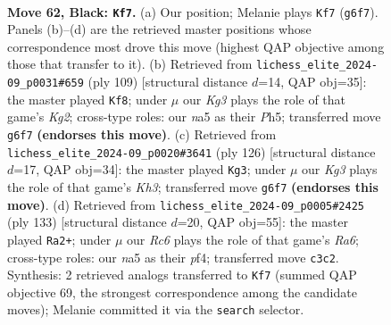 \documentclass[11pt]{article}
\begin{document}
\clearpage

\begin{figure}[p]\centering
\begin{subfigure}{0.46\textwidth}\centering
\resizebox{\linewidth}{!}{%
\newchessgame
\chessboard[
  setfen={8/6p1/3R1pk1/N6p/3P3P/2r3P1/7K/8 b - - 18 62},
  showmover=false,
  pgfstyle=straightmove, color=movearrow, markmove={g6-f7}
]}
\caption{}
\end{subfigure}\hfill
\begin{subfigure}{0.46\textwidth}\centering
\resizebox{\linewidth}{!}{%
\newchessgame
\chessboard[
  setfen={8/R4pk1/6p1/P3P1Pp/5P1r/5K2/8/8 b - - 0 55},
  showmover=false,
  pgfstyle=straightmove, color=movearrow, markmove={g7-f8}
]}
\caption{}
\end{subfigure}
\\[4pt]
\begin{subfigure}{0.46\textwidth}\centering
\resizebox{\linewidth}{!}{%
\newchessgame
\chessboard[
  setfen={8/8/5kp1/R6p/7P/2r2P1K/6P1/8 w - - 24 64},
  showmover=false,
  pgfstyle=straightmove, color=movearrow, markmove={h3-g3}
]}
\caption{}
\end{subfigure}\hfill
\begin{subfigure}{0.46\textwidth}\centering
\resizebox{\linewidth}{!}{%
\newchessgame
\chessboard[
  setfen={8/3R1pk1/6p1/4P2p/5P1P/r5P1/6K1/8 b - - 12 67},
  showmover=false,
  pgfstyle=straightmove, color=movearrow, markmove={a3-a2}
]}
\caption{}
\end{subfigure}
\caption{\textbf{Move 62, Black: \texttt{Kf7}.} (a) Our position; Melanie plays \texttt{Kf7} (\texttt{g6f7}). Panels (b)--(d) are the retrieved master positions whose correspondence most drove this move (highest QAP objective among those that transfer to it). (b) Retrieved from \texttt{lichess\_elite\_2024-09\_p0031\#659} (ply 109) [structural distance $d$=14, QAP obj=35]: the master played \texttt{Kf8}; under $\mu$ our \emph{Kg3} plays the role of that game's \emph{Kg2}; cross-type roles: our \emph{n}a5 as their \emph{P}h5; transferred move \texttt{g6f7} \textbf{(endorses this move)}. (c) Retrieved from \texttt{lichess\_elite\_2024-09\_p0020\#3641} (ply 126) [structural distance $d$=17, QAP obj=34]: the master played \texttt{Kg3}; under $\mu$ our \emph{Kg3} plays the role of that game's \emph{Kh3}; transferred move \texttt{g6f7} \textbf{(endorses this move)}. (d) Retrieved from \texttt{lichess\_elite\_2024-09\_p0005\#2425} (ply 133) [structural distance $d$=20, QAP obj=55]: the master played \texttt{Ra2+}; under $\mu$ our \emph{Rc6} plays the role of that game's \emph{Ra6}; cross-type roles: our \emph{n}a5 as their \emph{p}f4; transferred move \texttt{c3c2}. Synthesis: 2 retrieved analogs transferred to \texttt{Kf7} (summed QAP objective 69, the strongest correspondence among the candidate moves); Melanie committed it via the \texttt{search} selector.}
\label{fig:thought-m123}
\end{figure}
\end{document}
